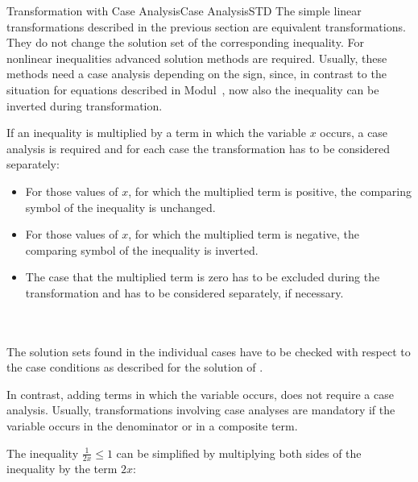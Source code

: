 \begin{MXContent}{Transformation with Case Analysis}{Case Analysis}{STD}
The simple linear transformations described in the previous section are equivalent transformations.
They do not change the solution set of the corresponding inequality. For nonlinear
inequalities advanced solution methods are required. Usually, these methods need 
a case analysis depending on the sign, since, in contrast to the situation for
equations described in Modul~, now also the inequality can be inverted during 
transformation.

 
\begin{MInfo}
If an inequality is multiplied by a term in which the variable $x$ occurs, a case analysis 
is required and for each case the transformation has to be considered separately: 

\begin{itemize}
\item{For those values of $x$, for which the multiplied term is positive, the comparing symbol
of the inequality is unchanged.}
\item{For those values of $x$, for which the multiplied term is negative, the comparing symbol
of the inequality is inverted.}
\item{The case that the multiplied term is zero has to be excluded during the transformation and
has to be considered separately, if necessary.}
\end{itemize}
\ \\ \ \\
The solution sets found in the individual cases have to be checked with respect to the case conditions
as described for the solution of .
\end{MInfo}

In contrast, adding terms in which the variable occurs, does not require a case analysis. Usually, 
transformations involving case analyses are mandatory if the variable occurs in the denominator or 
in a composite term.


\begin{MExample}
The inequality $\frac1{2x}\leq 1$ can be simplified by multiplying both sides of the inequality
by the term $2x$:


\end{MExample}
\end{MXContent}

